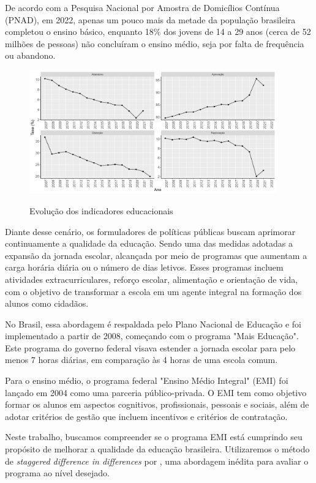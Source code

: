 De acordo com a Pesquisa Nacional por Amostra de Domicílios Contínua (PNAD), em 2022, apenas um pouco mais da metade da população brasileira completou o ensino básico, enquanto 18\% dos jovens de 14 a 29 anos (cerca de 52 milhões de pessoas) não concluíram o ensino médio, seja por falta de frequência ou abandono. 

\begin{figure}[H]
    \centering
    \caption{Evolução dos indicadores educacionais}
    \includegraphics[width=0.95\textwidth]{Charts/serie_media_indicadores.png}
    \label{fig:serie_medi_indicadores}
\end{figure}

Diante desse cenário, os formuladores de políticas públicas buscam aprimorar continuamente a qualidade da educação. Sendo uma das medidas adotadas a expansão da jornada escolar, alcançada por meio de programas que aumentam a carga horária diária ou o número de dias letivos. Esses programas incluem atividades extracurriculares, reforço escolar, alimentação e orientação de vida, com o objetivo de transformar a escola em um agente integral na formação dos alunos como cidadãos.

No Brasil, essa abordagem é respaldada pelo Plano Nacional de Educação e foi implementado a partir de 2008, começando com o programa "Mais Educação". Este programa do governo federal visava estender a jornada escolar para pelo menos 7 horas diárias, em comparação às 4 horas de uma escola comum.

Para o ensino médio, o programa federal "Ensino Médio Integral" (EMI) foi lançado em 2004 como uma parceria público-privada. O EMI tem como objetivo formar os alunos em aspectos cognitivos, profissionais, pessoais e sociais, além de adotar critérios de gestão que incluem incentivos e critérios de contratação.

Neste trabalho, buscamos compreender se o programa EMI está cumprindo seu propósito de melhorar a qualidade da educação brasileira. Utilizaremos o método de \textit{staggered difference in differences} por \cite{CB_2021}, uma abordagem inédita para avaliar o programa ao nível desejado.

